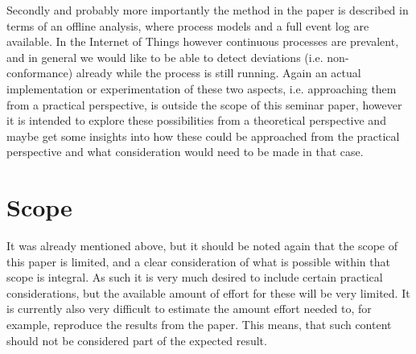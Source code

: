 \documentclass[runningheads]{template/llncs}
\begin{document}
Secondly and probably more importantly the method in the paper is described in terms of an offline analysis, where process models and a full event log are available. In the Internet of Things however continuous processes are prevalent, and in general we would like to be able to detect deviations (i.e. non-conformance) already while the process is still running.
Again an actual implementation or experimentation of these two aspects, i.e. approaching them from a practical perspective, is outside the scope of this seminar paper, however it is intended to explore these possibilities from a theoretical perspective and maybe get some insights into how these could be approached from the practical perspective and what consideration would need to be made in that case.
\section{Scope}
It was already mentioned above, but it should be noted again that the scope of this paper is limited, and a clear consideration of what is possible within that scope is integral.
As such it is very much desired to include certain practical considerations, but the available amount of effort for these will be very limited.
It is currently also very difficult to estimate the amount effort needed to, for example, reproduce the results from the paper.
This means, that such content should not be considered part of the expected result.

%
%
%


%
\end{document}
